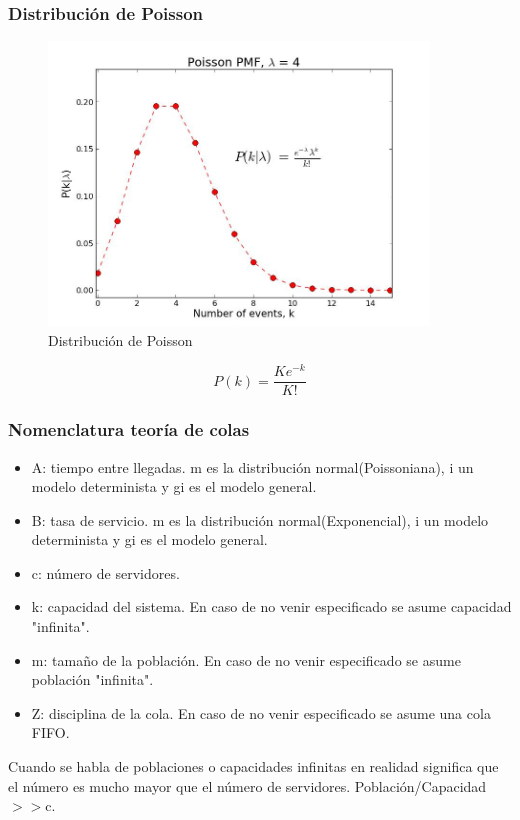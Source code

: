 \subsubsection{Distribución de Poisson}
\begin{figure}[H]
\centering
\includegraphics[width=0.9\textwidth]{Imagen/distribucionpoisson.jpg}
\caption{Distribución de Poisson}
\label{}
\end{figure}
\begin{equation}
P(k)=\frac{Ke^{-k}}{K!}
\end{equation}
\subsubsection{Nomenclatura teoría de colas}
\begin{center}
 \par
\end{center}
\begin{itemize}
\item {A:} tiempo entre llegadas. m es la distribución normal(Poissoniana), i un modelo determinista y gi es el modelo general.
\item {B:} tasa de servicio. m es la distribución normal(Exponencial), i un modelo determinista y gi es el modelo general.
\item {c:} número de servidores.
\item {k:} capacidad del sistema. En caso de no venir especificado se asume capacidad "infinita".
\item {m:} tamaño de la población. En caso de no venir especificado se asume población "infinita".
\item {Z:} disciplina de la cola. En caso de no venir especificado se asume una cola FIFO.
\end{itemize}
Cuando se habla de poblaciones o capacidades infinitas en realidad significa que el número es mucho mayor que el número de servidores. Población/Capacidad$>>$c.
